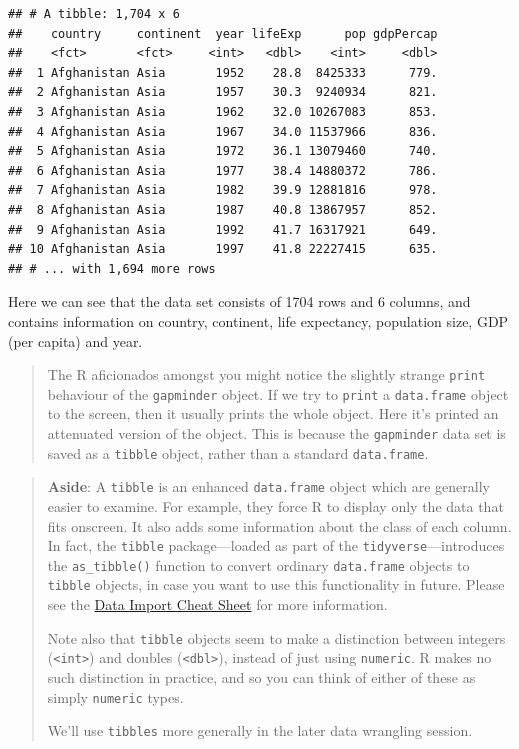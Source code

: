 \documentclass[]{book}
\theoremstyle{definition}
\theoremstyle{definition}
\theoremstyle{definition}
\theoremstyle{remark}
\begin{document}
\begin{verbatim}
## # A tibble: 1,704 x 6
##    country     continent  year lifeExp      pop gdpPercap
##    <fct>       <fct>     <int>   <dbl>    <int>     <dbl>
##  1 Afghanistan Asia       1952    28.8  8425333      779.
##  2 Afghanistan Asia       1957    30.3  9240934      821.
##  3 Afghanistan Asia       1962    32.0 10267083      853.
##  4 Afghanistan Asia       1967    34.0 11537966      836.
##  5 Afghanistan Asia       1972    36.1 13079460      740.
##  6 Afghanistan Asia       1977    38.4 14880372      786.
##  7 Afghanistan Asia       1982    39.9 12881816      978.
##  8 Afghanistan Asia       1987    40.8 13867957      852.
##  9 Afghanistan Asia       1992    41.7 16317921      649.
## 10 Afghanistan Asia       1997    41.8 22227415      635.
## # ... with 1,694 more rows
\end{verbatim}

Here we can see that the data set consists of 1704 rows and 6 columns,
and contains information on country, continent, life expectancy,
population size, GDP (per capita) and year.

\begin{quote}
The R aficionados amongst you might notice the slightly strange
\texttt{print} behaviour of the \texttt{gapminder} object. If we try to
\texttt{print} a \texttt{data.frame} object to the screen, then it
usually prints the whole object. Here it's printed an attenuated version
of the object. This is because the \texttt{gapminder} data set is saved
as a \texttt{tibble} object, rather than a standard \texttt{data.frame}.
\end{quote}

\begin{quote}
\textbf{Aside}: A \texttt{tibble} is an enhanced \texttt{data.frame}
object which are generally easier to examine. For example, they force R
to display only the data that fits onscreen. It also adds some
information about the class of each column. In fact, the \texttt{tibble}
package---loaded as part of the \texttt{tidyverse}---introduces the
\texttt{as\_tibble()} function to convert ordinary \texttt{data.frame}
objects to \texttt{tibble} objects, in case you want to use this
functionality in future. Please see the
\href{https://github.com/rstudio/cheatsheets/raw/master/data-import.pdf}{Data
Import Cheat Sheet} for more information.

Note also that \texttt{tibble} objects seem to make a distinction
between integers (\texttt{\textless{}int\textgreater{}}) and doubles
(\texttt{\textless{}dbl\textgreater{}}), instead of just using
\texttt{numeric}. R makes no such distinction in practice, and so you
can think of either of these as simply \texttt{numeric} types.

We'll use \texttt{tibbles} more generally in the later data wrangling
session.
\end{quote}
\end{document}
